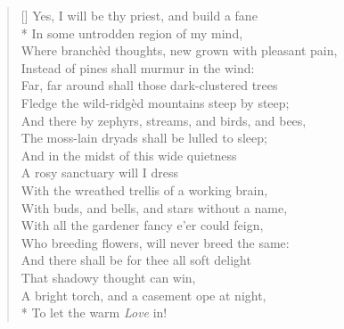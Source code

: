 \documentclass[MAIN]{subfiles}
\begin{document}
\begin{verse}[\versewidth]
Yes, I will be thy priest, and build a fane\\*
\vin In some untrodden region of my mind,\\
Where branch\`ed thoughts, new grown with pleasant pain,\\
\vin Instead of pines shall murmur in the wind:\\
Far, far around shall those dark-clustered trees\\ 
\vin Fledge the wild-ridg\`ed mountains steep by steep;\\
And there by zephyrs, streams, and birds, and bees,\\ 
\vin The moss-lain dryads shall be lulled to sleep;\\
And in the midst of this wide quietness\\
A rosy sanctuary will I dress\\
With the wreathed trellis of a working brain,\\
\vin With buds, and bells, and stars without a name,\\
With all the gardener fancy e'er could feign,\\
\vin Who breeding flowers, will never breed the same:\\
And there shall be for thee all soft delight\\
\vin That shadowy thought can win,\\
A bright torch, and a casement ope at night,\\*
\vin To let the warm \emph{Love} in! 
\end{verse}
\end{document}
